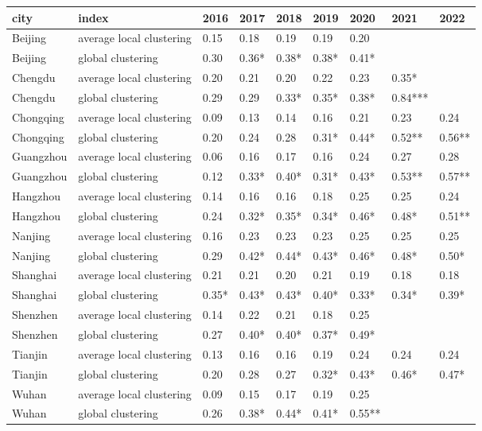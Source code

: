 \begin{tabular}{lllllllll}
\hline
 city      & index                    & 2016   & 2017   & 2018   & 2019   & 2020   & 2021    & 2022   \\
\hline
 Beijing   & average local clustering & 0.15   & 0.18   & 0.19   & 0.19   & 0.20   &         &        \\
 Beijing   & global clustering        & 0.30   & 0.36*  & 0.38*  & 0.38*  & 0.41*  &         &        \\
 Chengdu   & average local clustering & 0.20   & 0.21   & 0.20   & 0.22   & 0.23   & 0.35*   &        \\
 Chengdu   & global clustering        & 0.29   & 0.29   & 0.33*  & 0.35*  & 0.38*  & 0.84*** &        \\
 Chongqing & average local clustering & 0.09   & 0.13   & 0.14   & 0.16   & 0.21   & 0.23    & 0.24   \\
 Chongqing & global clustering        & 0.20   & 0.24   & 0.28   & 0.31*  & 0.44*  & 0.52**  & 0.56** \\
 Guangzhou & average local clustering & 0.06   & 0.16   & 0.17   & 0.16   & 0.24   & 0.27    & 0.28   \\
 Guangzhou & global clustering        & 0.12   & 0.33*  & 0.40*  & 0.31*  & 0.43*  & 0.53**  & 0.57** \\
 Hangzhou  & average local clustering & 0.14   & 0.16   & 0.16   & 0.18   & 0.25   & 0.25    & 0.24   \\
 Hangzhou  & global clustering        & 0.24   & 0.32*  & 0.35*  & 0.34*  & 0.46*  & 0.48*   & 0.51** \\
 Nanjing   & average local clustering & 0.16   & 0.23   & 0.23   & 0.23   & 0.25   & 0.25    & 0.25   \\
 Nanjing   & global clustering        & 0.29   & 0.42*  & 0.44*  & 0.43*  & 0.46*  & 0.48*   & 0.50*  \\
 Shanghai  & average local clustering & 0.21   & 0.21   & 0.20   & 0.21   & 0.19   & 0.18    & 0.18   \\
 Shanghai  & global clustering        & 0.35*  & 0.43*  & 0.43*  & 0.40*  & 0.33*  & 0.34*   & 0.39*  \\
 Shenzhen  & average local clustering & 0.14   & 0.22   & 0.21   & 0.18   & 0.25   &         &        \\
 Shenzhen  & global clustering        & 0.27   & 0.40*  & 0.40*  & 0.37*  & 0.49*  &         &        \\
 Tianjin   & average local clustering & 0.13   & 0.16   & 0.16   & 0.19   & 0.24   & 0.24    & 0.24   \\
 Tianjin   & global clustering        & 0.20   & 0.28   & 0.27   & 0.32*  & 0.43*  & 0.46*   & 0.47*  \\
 Wuhan     & average local clustering & 0.09   & 0.15   & 0.17   & 0.19   & 0.25   &         &        \\
 Wuhan     & global clustering        & 0.26   & 0.38*  & 0.44*  & 0.41*  & 0.55** &         &        \\
\hline
\end{tabular}